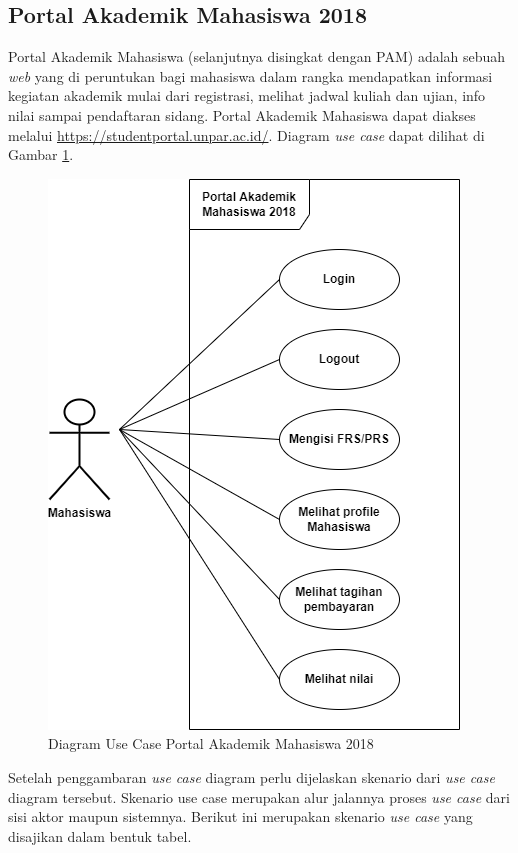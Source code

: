 \subsection{Portal Akademik Mahasiswa 2018}
\label{sec:pam} 
Portal Akademik Mahasiswa (selanjutnya disingkat dengan PAM) adalah sebuah \textit{web} yang di peruntukan bagi mahasiswa dalam rangka mendapatkan informasi kegiatan akademik mulai dari registrasi, melihat jadwal kuliah dan ujian, info nilai sampai pendaftaran sidang\cite{portalunpar}. Portal Akademik Mahasiswa dapat diakses melalui \url{https://studentportal.unpar.ac.id/}. Diagram \textit{use case} dapat dilihat di Gambar \ref{fig:usecase2018}.

\begin{figure}[H]
	\centering
	\includegraphics[scale=0.6]{Gambar/usecase.png}
	\caption{Diagram Use Case Portal Akademik Mahasiswa 2018} 
	\label{fig:usecase2018}
\end{figure}
Setelah penggambaran \textit{use case} diagram perlu dijelaskan skenario dari \textit{use case} diagram tersebut. Skenario use case merupakan alur jalannya proses \textit{use case} dari sisi aktor maupun sistemnya. Berikut ini merupakan skenario \textit{use case} yang disajikan dalam bentuk tabel.
 

